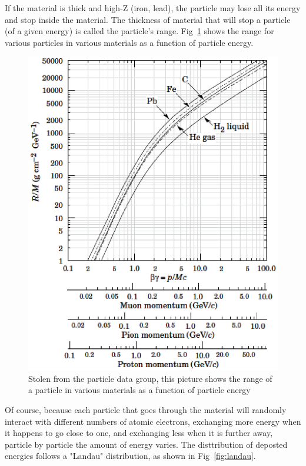 If the material is thick and high-Z (iron, lead), the particle may lose all its energy and 
stop inside the material.  The thickness of material that will stop a particle (of a given energy) is called the particle's range.  Fig~\ref{fig:pdgrange} shows the range for various particles in various materials as a function of particle energy.


\begin{figure}[h]
\centering\includegraphics[scale=0.5]{./particleinteractions/Pictures/pdgrange.eps}
\caption{Stolen from the particle data group, this picture shows the range of a particle in various materials as a function of particle energy }
\label{fig:pdgrange}
\end{figure}

Of course, because each particle that goes through the material will randomly interact with different numbers of atomic electrons, exchanging more energy when it happens to go close to one, and exchanging less when it is further away, particle by particle the amount of energy varies.  The disttribution of deposted energies follows a "Landau" distribution, as shown in Fig~\ref{fig:landau}.


